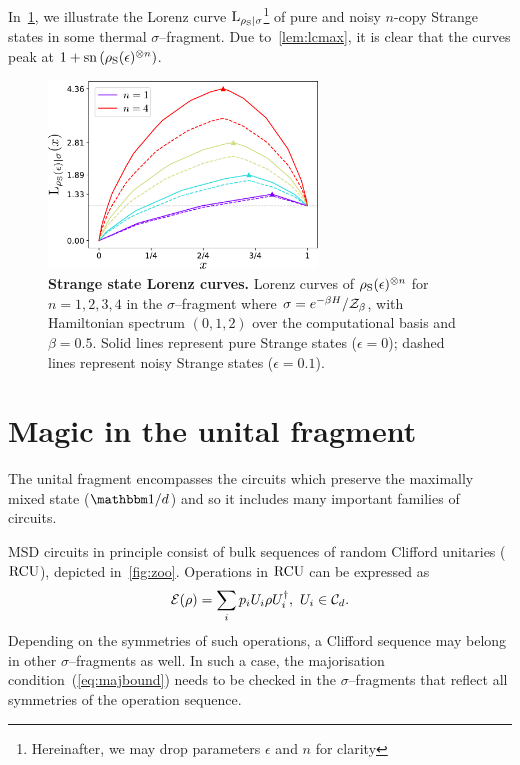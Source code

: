 \documentclass[pra,
aps,
twocolumn,
superscriptaddress,
groupedaddress,
nofootinbib,
reprint
]{revtex4-1}
\begin{document}
In~\cref{fig:lcs}, we illustrate the Lorenz curve ${{\rm{L}}_{\rho_{\rm{S}}|\sigma}}$\footnote{Hereinafter, we may drop parameters $\epsilon$ and $n$ for clarity} of pure and noisy $n$-copy Strange states in some thermal $\sigma$--fragment.
Due to~\cref{lem:lcmax}, it is clear that the curves peak at $1 + {{\rm{sn}}\left(\rho_{\rm{S}}(\epsilon)^{\otimes n}\right)}$.
\begin{figure}
    \centering
    \includegraphics[height=5cm]{figs/lc_strange.pdf}
    \caption{\textbf{Strange state Lorenz curves.} Lorenz curves of $\rho_{\rm{S}}(\epsilon)^{\otimes n}$ for $n=1,2,3,4$ in the $\sigma$--fragment where $\sigma = e^{-\beta H}/\mathcal{Z}_{\beta}$, with Hamiltonian spectrum $(0,1,2)$ over the computational basis and $\beta = 0.5$.
    Solid lines represent pure Strange states ($\epsilon = 0$); dashed lines represent noisy Strange states ($\epsilon = 0.1$).
    }
    \label{fig:lcs}
\end{figure}

\section{Magic in the unital fragment}
\label{sec:unital}

The unital fragment encompasses the circuits which preserve the maximally mixed state ($\id/d$) and so it includes many important families of circuits.

MSD circuits in principle consist of bulk sequences of random Clifford unitaries (${\rm{RCU}}$), depicted in~\cref{fig:zoo}.
Operations in ${\rm{RCU}}$ can be expressed as
\begin{equation}
    \mathcal{E}(\rho) = \sum_i p_i U_i \rho U_i^\dagger,\ U_i \in \mathcal{C}_d.
\end{equation}
Depending on the symmetries of such operations, a Clifford sequence may belong in other $\sigma$--fragments as well.
In such a case, the majorisation condition~(\ref{eq:majbound}) needs to be checked in the $\sigma$--fragments that reflect all symmetries of the operation sequence.
\end{document}
